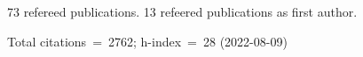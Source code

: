 73 refereed publications. 13 refeered publications as first author.

Total citations~=~2762; h-index~=~28 (2022-08-09)